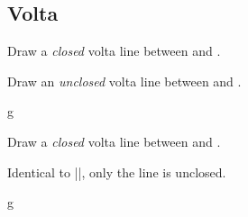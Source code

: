\subsection{Volta}\label{sec:line:volta}
\begin{command}{\tmvolta{}}
  Draw a \emph{closed} volta line between  and .
\end{command}
\begin{command}{\tmvolta*{}}
  Draw an \emph{unclosed} volta line between  and .
\end{command}
\begin{codeexample}[]
\begin{tmline}
\begin{tmstaff}{g}{}
\end{tmstaff}
\end{tmline}
\end{codeexample}
\begin{command}{\tmvoltaline{}}
  Draw a \emph{closed} volta line between  and .
\end{command}
\begin{command}{\tmvoltaline*{}}
  Identical to |\tmvoltaline|, only the line is unclosed.
\end{command}
\begin{codeexample}[]
\begin{tmline}
  \begin{tmstaff}{g}{}
  \end{tmstaff}
\end{tmline}
\end{codeexample}
